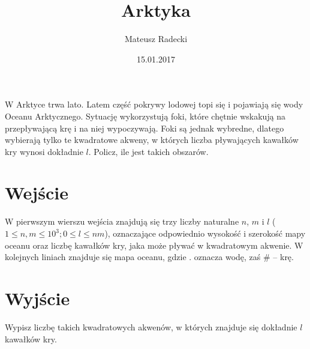 \documentclass[zad,zawodnik,utf8]{sinol}
\title{Arktyka}
\author{Mateusz Radecki} %
\date{15.01.2017}
\begin{document}
\begin{tasktext}%

W Arktyce trwa lato. Latem część pokrywy lodowej topi się i pojawiają się wody Oceanu Arktycznego. Sytuację wykorzystują foki, które chętnie wskakują na przepływającą krę i na niej wypoczywają. Foki są jednak wybredne, dlatego wybierają tylko te kwadratowe akweny, w których liczba pływających kawałków kry wynosi dokładnie $l$. Policz, ile jest takich obszarów.

  \section{Wejście}
W pierwszym wierszu wejścia znajdują się trzy liczby naturalne $n$, $m$ i $l$ ($1 \leq n,m \leq 10^3; 0 \leq l \leq nm $), oznaczające odpowiednio wysokość i szerokość mapy oceanu oraz liczbę kawałków kry, jaka może pływać w kwadratowym akwenie. W kolejnych liniach znajduje się mapa oceanu, gdzie . oznacza wodę, zaś \# – krę.

  \section{Wyjście}
Wypisz liczbę takich kwadratowych akwenów, w których znajduje się dokładnie $l$ kawałków kry.
  
\makecompactexample

\end{tasktext}
\end{document}
